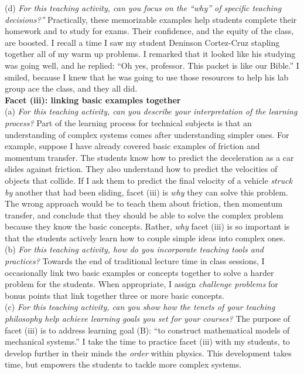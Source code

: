 \documentclass[../../../main.tex]{subfiles}
\begin{document}
(d) \textit{For this teaching activity, can you focus on the ``why'' of specific teaching decisions?''} Practically, these memorizable examples help students complete their homework and to study for exams.  Their confidence, and the equity of the class, are boosted.  I recall a time I saw my student Deninson Cortez-Cruz stapling together all of my warm up problems.  I remarked that it looked like his studying was going well, and he replied: ``Oh yes, professor.  This packet is like our Bible.''  I smiled, because I knew that he was going to use those resources to help his lab group ace the class, and they all did.
\\
\vspace{0.25cm}
\textbf{Facet (iii): linking basic examples together}
\\
\vspace{0.25cm}
(a) \textit{For this teaching activity, can you describe your interpretation of the learning process?} Part of the learning process for technical subjects is that an understanding of complex systems comes after understanding simpler ones.  For example, suppose I have already covered basic examples of friction and momentum transfer.  The students know how to predict the deceleration as a car slides against friction.  They also understand how to predict the velocities of objects that collide.  If I ask them to predict the final velocity of a vehicle \textit{struck by} another that had been sliding, facet (iii) is \textit{why} they can solve this problem.  The wrong approach would be to teach them about friction, then momentum transfer, and conclude that they should be able to solve the complex problem because they know the basic concepts.  Rather, \textit{why} facet (iii) is so important is that the students actively learn how to couple simple ideas into complex ones.
\\
\vspace{0.25cm}
(b) \textit{For this teaching activity, how do you incorporate teaching tools and practices?} Towards the end of traditional lecture time in class sessions, I occasionally link two basic examples or concepts together to solve a harder problem for the students.  When appropriate, I assign \textit{challenge problems} for bonus points that link together three or more basic concepts.
\\
\vspace{0.25cm}
(c) \textit{For this teaching activity, can you show how the tenets of your teaching philosophy help achieve learning goals you set for your courses?}  The purpose of facet (iii) is to address learning goal (B): ``to construct mathematical models of mechanical systems.''  I take the time to practice facet (iii) with my students, to develop further in their minds the \textit{order} within physics.  This development takes time, but empowers the students to tackle more complex systems. 
\end{document}
